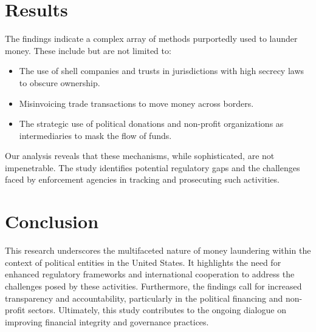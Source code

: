 \documentclass{article}
\begin{document}
\section{Results}
The findings indicate a complex array of methods purportedly used to launder money. These include but are not limited to:
\begin{itemize}
    \item The use of shell companies and trusts in jurisdictions with high secrecy laws to obscure ownership.
    \item Misinvoicing trade transactions to move money across borders.
    \item The strategic use of political donations and non-profit organizations as intermediaries to mask the flow of funds.
\end{itemize}
Our analysis reveals that these mechanisms, while sophisticated, are not impenetrable. The study identifies potential regulatory gaps and the challenges faced by enforcement agencies in tracking and prosecuting such activities.

\section{Conclusion}
This research underscores the multifaceted nature of money laundering within the context of political entities in the United States. It highlights the need for enhanced regulatory frameworks and international cooperation to address the challenges posed by these activities. Furthermore, the findings call for increased transparency and accountability, particularly in the political financing and non-profit sectors. Ultimately, this study contributes to the ongoing dialogue on improving financial integrity and governance practices.
\end{document}
